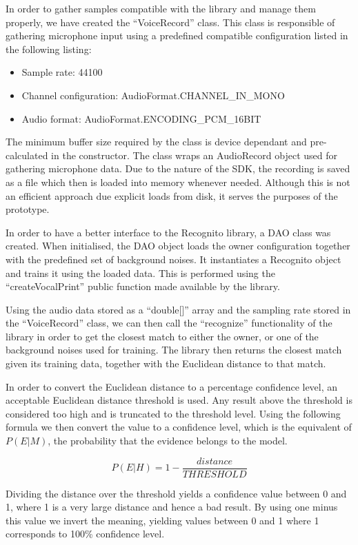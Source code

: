 In order to gather samples compatible with the library and manage them properly, we have created the ``VoiceRecord'' class. This class is responsible of gathering microphone input using a predefined compatible configuration listed in the following listing:
\begin{itemize}
	\item Sample rate: 44100
	\item Channel configuration: AudioFormat.CHANNEL\_IN\_MONO
	\item Audio format: AudioFormat.ENCODING\_PCM\_16BIT
\end{itemize}

The minimum buffer size required by the class is device dependant and pre-calculated in the constructor. The class wraps an AudioRecord object used for gathering microphone data. Due to the nature of the SDK, the recording is saved as a file which then is loaded into memory whenever needed. Although this is not an efficient approach due explicit loads from disk, it serves the purposes of the prototype.

In order to have a better interface to the Recognito library, a DAO class was created. When initialised, the DAO object loads the owner configuration together with the predefined set of background noises. It instantiates a Recognito object and trains it using the loaded data. This is performed using the ``createVocalPrint'' public function made available by the library.

Using the audio data stored as a ``double[]'' array and the sampling rate stored in the ``VoiceRecord'' class, we can then call the ``recognize'' functionality of the library in order to get the closest match to either the owner, or one of the background noises used for training. The library then returns the closest match given its training data, together with the Euclidean distance to that match.

In order to convert the Euclidean distance to a percentage confidence level, an acceptable Euclidean distance threshold is used. Any result above the threshold is considered too high and is truncated to the threshold level. Using the following formula we then convert the value to a confidence level, which is the equivalent of $P(E|M)$, the probability that the evidence belongs to the model.

$$P(E|H) = 1 - \frac{distance}{THRESHOLD}$$

Dividing the distance over the threshold yields a confidence value between 0 and 1, where 1 is a very large distance and hence a bad result. By using one minus this value we invert the meaning, yielding values between 0 and 1 where 1 corresponds to 100\% confidence level. 

